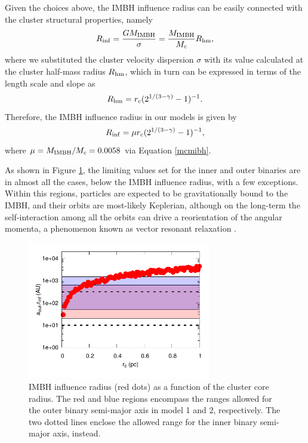 \documentclass[twocolumn]{aastex62}
\newcommand{\ibh}{{\rm IMBH}}
\begin{document}
Given the choices above, the IMBH influence radius can be easily connected with the cluster structural properties, namely
\begin{equation}
R_{\rm inf} = \frac{GM_\ibh}{\sigma} = \frac{M_\ibh}{M_c}R_{\rm hm},
\end{equation}
where we substituted the cluster velocity dispersion $\sigma$ with its value calculated at the cluster half-mass radius $R_{\rm hm}$, which in turn can be expressed in terms of the length scale and slope as
\begin{equation}
R_{\rm hm} = r_c(2^{1/(3-\gamma)}-1)^{-1}.
\end{equation} 
Therefore, the IMBH influence radius in our models is given by 
\begin{equation}
R_{\rm inf} = \mu r_c(2^{1/(3-\gamma)}-1)^{-1},
\end{equation}
where $\mu = M_\ibh/M_c = 0.0058$ via Equation \ref{mcmibh}.

As shown in Figure \ref{corerad}, the limiting values set for the inner and outer binaries are in almost all the cases, below the IMBH influence radius, with a few exceptions. Within this regions, particles are expected to be gravitationally bound to the IMBH, and their orbits are most-likely Keplerian, although on the long-term the self-interaction among all the orbits can drive a reorientation of the angular momenta, a phenomenon known as vector resonant relaxation \cite{}.

\begin{figure}
\centering 
\includegraphics[width=8cm]{core_influ}
\caption{IMBH influence radius (red dots) as a function of the cluster core radius. The red and blue regions encompass the ranges allowed for the outer binary semi-major axis in model 1 and 2, respectively. The two dotted lines enclose the allowed range for the inner binary semi-major axis, instead.}
\label{corerad}
\end{figure}
\end{document}
